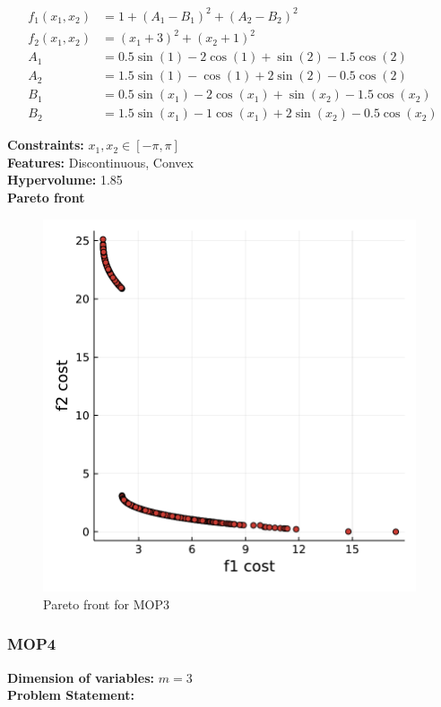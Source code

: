\documentclass[11pt,oneside,onecolumn,openright]{article}
\begin{document}
  \begin{equation}
  \begin{aligned}
  f_{1}\left(x_{1}, x_{2}\right) &=1+\left(A_{1}-B_{1}\right)^{2}+\left(A_{2}-B_{2}\right)^{2} \\
  f_{2}\left(x_{1}, x_{2}\right) &=\left(x_{1}+3\right)^{2}+\left(x_{2}+1\right)^{2} \\
  A_{1} &=0.5 \sin (1)-2 \cos (1)+\sin (2)-1.5 \cos (2) \\
  A_{2} &=1.5 \sin (1)-\cos (1)+2 \sin (2)-0.5 \cos (2) \\
  B_{1} &=0.5 \sin (x_{1})-2 \cos (x_{1})+\sin (x_{2})-1.5 \cos (x_{2}) \\
  B_{2} &=1.5 \sin (x_{1})-1 \cos (x_{1})+2 \sin (x_{2})-0.5 \cos (x_{2})
  \end{aligned}
  \end{equation}

  \noindent\textbf{Constraints: } $x_{1}, x_{2} \in[-\pi,\pi]$\\
  \noindent\textbf{Features: } Discontinuous, Convex\\
  \noindent\textbf{Hypervolume: } 1.85\\
  \noindent\textbf{Pareto front}
      \begin{figure}[H]
      \centering
      \includegraphics[width=11cm]{fig/mop3.pdf}
      \cprotect\caption{Pareto front for MOP3}
      \end{figure}

  \subsubsection{MOP4~\cite{huband2006review}}\label{sec:mop4}
   \textbf{Dimension of variables: }$m=3$\\
  \noindent\textbf{Problem Statement: }
\end{document}
